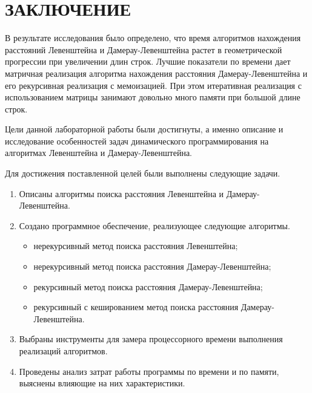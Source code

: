 \chapter*{\hfill{\centering  ЗАКЛЮЧЕНИЕ}\hfill}

В результате исследования было определено, что время алгоритмов нахождения расстояний Левенштейна и Дамерау-Левенштейна растет в геометрической прогрессии при увеличении длин строк.
Лучшие показатели по времени дает матричная реализация алгоритма нахождения расстояния Дамерау-Левенштейна и его рекурсивная реализация с мемоизацией.
При этом итеративная реализация с использованием матрицы занимают довольно много памяти при большой длине строк. 

Цели данной лабораторной работы были достигнуты, а именно описание и исследование особенностей задач динамического программирования на алгоритмах Левенштейна и Дамерау-Левенштейна.

Для достижения поставленной целей были выполнены следующие задачи.
\begin{enumerate}[label={\arabic*)}]
	\item Описаны алгоритмы поиска расстояния Левенштейна и \newline Дамерау-Левенштейна.
	\item Создано программное обеспечение, реализующее следующие алгоритмы.
	\begin{itemize}[label=---]
		\item нерекурсивный метод поиска расстояния Левенштейна;
		\item нерекурсивный метод поиска расстояния Дамерау-Левенштейна;
		\item рекурсивный метод поиска расстояния Дамерау-Левенштейна;
		\item рекурсивный с кешированием метод поиска расстояния Дамерау-Левенштейна.
	\end{itemize}
	\item Выбраны инструменты для замера процессорного времени выполнения реализаций алгоритмов.
	\item Проведены анализ затрат работы программы по времени и по памяти, выяснены влияющие на них характеристики. 
\end{enumerate}
